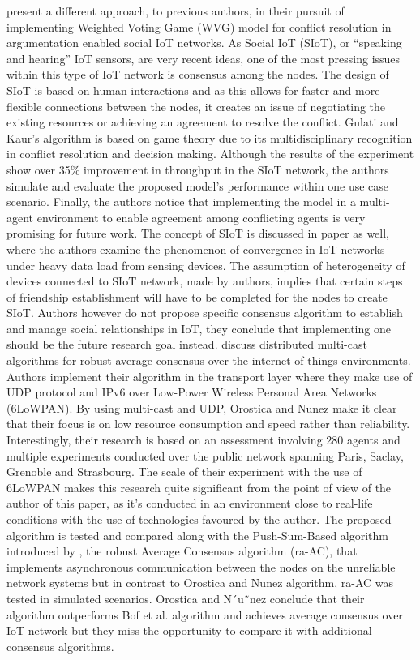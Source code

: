 \documentclass[oneside,12pt]{book}
\begin{document}
\cite{GULATI2020102222} present a different approach, to previous authors, in their pursuit of implementing Weighted Voting Game (WVG) model for conflict resolution in argumentation enabled social IoT networks. As Social IoT (SIoT), or “speaking and hearing” IoT sensors, are very recent ideas, one of the most pressing issues within this type of IoT network is consensus among the nodes. The design of SIoT is based on human interactions and as this allows for faster and more flexible connections between the nodes, it creates an issue of negotiating the existing resources or achieving an agreement to resolve the conflict. Gulati and Kaur’s algorithm is based on game theory due to its multidisciplinary recognition in conflict resolution and decision making. Although the results of the experiment show over 35\% improvement in throughput in the SIoT network, the authors simulate and evaluate the proposed model’s performance within one use case scenario. Finally, the authors notice that implementing the model in a multi-agent environment to enable agreement among conflicting agents is very promising for future work.\smallskip \newline
The concept of SIoT is discussed in \cite{SocialIOT} paper as well, where the authors examine the phenomenon of convergence in IoT networks under heavy data load from sensing devices. The assumption of heterogeneity of devices connected to SIoT network, made by authors, implies that certain steps of friendship establishment will have to be completed for the nodes to create SIoT. Authors however do not propose specific consensus algorithm to establish and manage social relationships in IoT, they conclude that implementing one should be the future research goal instead.\smallskip \newline
\cite{OROSTICA201915} discuss distributed multi-cast algorithms for robust average consensus over the internet of things environments. Authors implement their algorithm in the transport layer where they make use of UDP protocol and IPv6 over Low-Power Wireless Personal Area Networks (6LoWPAN). By using multi-cast and UDP, Orostica and Nunez make it clear that their focus is on low resource consumption and speed rather than reliability. Interestingly, their research is based on an assessment involving 280 agents and multiple experiments conducted over the public network spanning Paris, Saclay, Grenoble and Strasbourg. The scale of their experiment with the use of 6LoWPAN makes this research quite significant from the point of view of the author of this paper, as it’s conducted in an environment close to real-life conditions with the use of technologies favoured by the author. The proposed algorithm is tested and compared along with the Push-Sum-Based algorithm introduced by \cite{BOF2017601}, the robust Average Consensus algorithm (ra-AC), that implements asynchronous communication between the nodes on the unreliable network systems but in contrast to Orostica and Nunez algorithm, ra-AC was tested in simulated scenarios. Orostica and N´u˜nez conclude that their algorithm outperforms Bof et al. algorithm and achieves average consensus over IoT network but they miss the opportunity to compare it with additional consensus algorithms.\smallskip \newline
\end{document}
